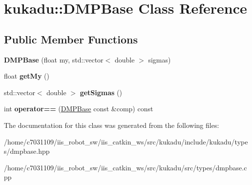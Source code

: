 \hypertarget{classkukadu_1_1DMPBase}{\section{kukadu\-:\-:D\-M\-P\-Base Class Reference}
\label{classkukadu_1_1DMPBase}
}
\subsection*{Public Member Functions}
\begin{DoxyCompactItemize}
\item 
\hypertarget{classkukadu_1_1DMPBase_a4a752a432b73e33eb50ab35b6109872c}{{\bfseries D\-M\-P\-Base} (float my, std\-::vector$<$ double $>$ sigmas)}\label{classkukadu_1_1DMPBase_a4a752a432b73e33eb50ab35b6109872c}

\item 
\hypertarget{classkukadu_1_1DMPBase_a2b25a18ef07e4c2202246aa1f142b0b7}{float {\bfseries get\-My} ()}\label{classkukadu_1_1DMPBase_a2b25a18ef07e4c2202246aa1f142b0b7}

\item 
\hypertarget{classkukadu_1_1DMPBase_af65d964c6a5ecd9f22961cbad41bc847}{std\-::vector$<$ double $>$ {\bfseries get\-Sigmas} ()}\label{classkukadu_1_1DMPBase_af65d964c6a5ecd9f22961cbad41bc847}

\item 
\hypertarget{classkukadu_1_1DMPBase_abf6e42c62e3d1dc00009b0576c85608e}{int {\bfseries operator==} (\hyperlink{classkukadu_1_1DMPBase}{D\-M\-P\-Base} const \&comp) const }\label{classkukadu_1_1DMPBase_abf6e42c62e3d1dc00009b0576c85608e}

\end{DoxyCompactItemize}


The documentation for this class was generated from the following files\-:\begin{DoxyCompactItemize}
\item 
/home/c7031109/iis\-\_\-robot\-\_\-sw/iis\-\_\-catkin\-\_\-ws/src/kukadu/include/kukadu/types/dmpbase.\-hpp\item 
/home/c7031109/iis\-\_\-robot\-\_\-sw/iis\-\_\-catkin\-\_\-ws/src/kukadu/src/types/dmpbase.\-cpp\end{DoxyCompactItemize}
